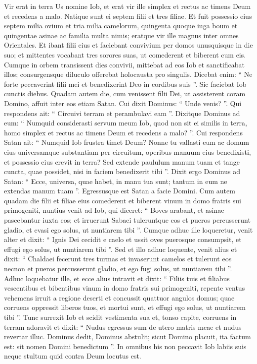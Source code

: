 \begin{biblechapter}
 \verse Vir erat in terra Us nomine Iob, et erat vir ille simplex et rectus ac timens Deum et recedens a malo. 
\verse Natique sunt ei septem filii et tres filiae. 
\verse Et fuit possessio eius septem milia ovium et tria milia camelorum, quingenta quoque iuga boum et quingentae asinae ac familia multa nimis; eratque vir ille magnus inter omnes Orientales.
 \verse Et ibant filii eius et faciebant convivium per domos unusquisque in die suo; et mittentes vocabant tres sorores suas, ut comederent et biberent cum eis. 
 \verse Cumque in orbem transissent dies convivii, mittebat ad eos Iob et sanctificabat illos; consurgensque diluculo offerebat holocausta pro singulis. Dicebat enim: “ Ne forte peccaverint filii mei et benedixerint Deo in cordibus suis ”. Sic faciebat Iob cunctis diebus.
 \verse Quadam autem die, cum venissent filii Dei, ut assisterent coram Domino, affuit inter eos etiam Satan. 
\verse Cui dixit Dominus: “ Unde venis? ”. Qui respondens ait: “ Circuivi terram et perambulavi eam ”. 
\verse Dixitque Dominus ad eum: “ Numquid considerasti servum meum Iob, quod non sit ei similis in terra, homo simplex et rectus ac timens Deum et recedens a malo? ”.
 \verse Cui respondens Satan ait: “ Numquid Iob frustra timet Deum? 
\verse Nonne tu vallasti eum ac domum eius universamque substantiam per circuitum, operibus manuum eius benedixisti, et possessio eius crevit in terra? 
\verse Sed extende paululum manum tuam et tange cuncta, quae possidet, nisi in faciem benedixerit tibi ”. 
\verse Dixit ergo Dominus ad Satan: “ Ecce, universa, quae habet, in manu tua sunt; tantum in eum ne extendas manum tuam ”. Egressusque est Satan a facie Domini.
 \verse Cum autem quadam die filii et filiae eius comederent et biberent vinum in domo fratris sui primogeniti, 
\verse nuntius venit ad Iob, qui diceret: “ Boves arabant, et asinae pascebantur iuxta eos; 
\verse et irruerunt Sabaei tuleruntque eos et pueros percusserunt gladio, et evasi ego solus, ut nuntiarem tibi ”.
 \verse Cumque adhuc ille loqueretur, venit alter et dixit: “ Ignis Dei cecidit e caelo et ussit oves puerosque consumpsit, et effugi ego solus, ut nuntiarem tibi ”. 
\verse Sed et illo adhuc loquente, venit alius et dixit: “ Chaldaei fecerunt tres turmas et invaserunt camelos et tulerunt eos necnon et pueros percusserunt gladio, et ego fugi solus, ut nuntiarem tibi ”.
 \verse Adhuc loquebatur ille, et ecce alius intravit et dixit: “ Filiis tuis et filiabus vescentibus et bibentibus vinum in domo fratris sui primogeniti, 
\verse repente ventus vehemens irruit a regione deserti et concussit quattuor angulos domus; quae corruens oppressit liberos tuos, et mortui sunt, et effugi ego solus, ut nuntiarem tibi ”.
 \verse Tunc surrexit Iob et scidit vestimenta sua et, tonso capite, corruens in terram adoravit 
\verse et dixit:
 “ Nudus egressus sum de utero matris meae
 et nudus revertar illuc.
 Dominus dedit, Dominus abstulit; sicut Domino placuit, ita factum est:
 sit nomen Domini benedictum ”.
 \verse In omnibus his non peccavit Iob labiis suis neque stultum quid contra Deum locutus est.
 

\end{biblechapter}
